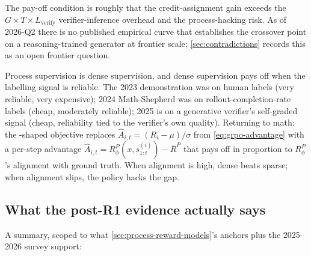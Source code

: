 The pay-off condition is roughly that the credit-assignment gain
exceeds the $G \times T \times L_{\text{verify}}$ verifier-inference
overhead and the process-hacking risk. As of 2026-Q2 there is no
published empirical curve that establishes the crossover point on a
reasoning-trained generator at frontier scale; \cref{sec:contradictions}
records this as an open frontier question.

\begin{intuition}
Process supervision is dense supervision, and dense supervision pays
off when the labelling signal is reliable. The 2023 
demonstration was on human labels (very reliable, very expensive);
2024 Math-Shepherd was on rollout-completion-rate labels (cheap,
moderately reliable); 2025  is on a generative verifier's
self-graded signal (cheap, reliability tied to the verifier's own
quality). Returning to math: the -shaped  objective replaces
$\hat A_{i,t} = (R_i - \mu)/\sigma$ from \cref{eq:grpo-advantage} with a
per-step advantage $\hat A_{i,t} = R^P_\phi(x, s^{(i)}_{1:t}) - \bar R^P$
that pays off in proportion to $R^P_\phi$'s alignment with ground truth.
When alignment is high, dense beats sparse; when alignment slips, the
policy hacks the gap.
\end{intuition}

\subsection{What the post-R1 evidence actually says}
\label{sec:prm-survival-evidence}

A summary, scoped to what \cref{sec:process-reward-models}'s anchors
plus the 2025--2026  survey support:

